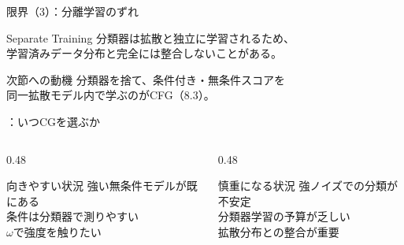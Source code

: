 \asmain
\begin{frame}{限界（3）：分離学習のずれ}
    \begin{alertblock}{Separate Training}
        分類器は拡散と独立に学習されるため、\\
        学習済みデータ分布と完全には整合しないことがある。
    \end{alertblock}
    \begin{exampleblock}{次節への動機}
        分類器を捨て、条件付き・無条件スコアを\\
        同一拡散モデル内で学ぶのがCFG（8.3）。
    \end{exampleblock}
\end{frame}
\assuppl
\begin{frame}{\supplmark：いつCGを選ぶか}
    \begin{columns}[T,onlytextwidth]
        \begin{column}{0.48\textwidth}
            \begin{block}{向きやすい状況}
                強い無条件モデルが既にある\\
                条件は分類器で測りやすい\\
                $\omega$で強度を触りたい
            \end{block}
        \end{column}
        \begin{column}{0.48\textwidth}
            \begin{block}{慎重になる状況}
                強ノイズでの分類が不安定\\
                分類器学習の予算が乏しい\\
                拡散分布との整合が重要
            \end{block}
        \end{column}
    \end{columns}
\end{frame}
